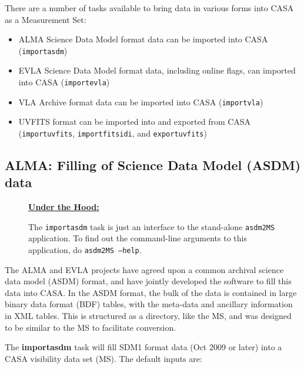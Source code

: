There are a number of tasks available to bring data in various forms
into CASA as a Measurement Set:

\begin{itemize}

\item ALMA Science Data Model format data can be imported
      into CASA ({\tt importasdm})

\item EVLA Science Data Model format data, including online flags,
      can imported into CASA ({\tt importevla})

\item VLA Archive format data can be imported into CASA
      ({\tt importvla})

\item UVFITS format can be imported into and exported from CASA
      ({\tt importuvfits}, {\tt importfitsidi}, and {\tt exportuvfits})

\end{itemize}

\subsection{ALMA: Filling of Science Data Model (ASDM) data}
\label{section:io.import.asdm}

\begin{wrapfigure}{r}{2.5in}
  \begin{boxedminipage}{2.5in}
     \centerline{\underline{\bf Under the Hood:}}
     The {\tt importasdm} task is just an interface to the stand-alone
     {\tt asdm2MS} application.  To find out the command-line
     arguments to this application, do {\tt asdm2MS --help}.
  \end{boxedminipage}
\end{wrapfigure}

The ALMA and EVLA projects have agreed upon a common archival science
data model (ASDM) format, and have jointly developed the software to
fill this data into CASA.  In the ASDM format, the bulk of the data is
contained in large binary data format (BDF) tables, with the meta-data
and ancillary information in XML tables.  This is structured as a
directory, like the MS, and was designed to be similar to the MS to 
facilitate conversion.

The {\bf importasdm} task will fill SDM1 format data (Oct 2009 or
later) into a CASA visibility data set (MS).  The default inputs are:

